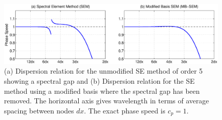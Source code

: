 \documentclass[11pt]{article}
\begin{document}
\begin{figure}[t]
\begin{center}
\includegraphics[width=6.5in, clip=true, trim=0cm 1.6cm 0cm 0.7cm]{ModifiedBasisMethod}
\end{center}
\caption{(a) Dispersion relation for the unmodified SE method of order 5 showing a spectral gap and (b) Dispersion relation for the SE method using a modified basis where the spectral gap has been removed.  The horizontal axis gives wavelength in terms of average spacing between nodes $dx$.  The exact phase speed is $c_p = 1$.} \label{fig:SEMDispersionGap}
\end{figure}
\end{document}
